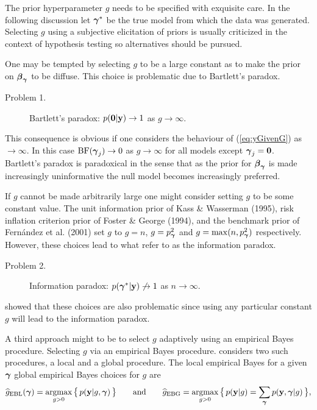 \documentclass{article}[12pt]
\begin{document}
The prior hyperparameter $g$ needs to be specified with exquisite care. 
In the following discussion let ${\boldsymbol \gamma}^*$ be the true model from which the data was generated. 
Selecting $g$ using a subjective elicitation of priors is usually criticized in the context of 
hypothesis testing so alternatives should be pursued. 

One may be tempted by selecting $g$ to be a large constant as to make the prior on
${\boldsymbol \beta}_{\boldsymbol \gamma}$ to be diffuse. This choice is problematic due to Bartlett's paradox. 
\begin{description}
	\item[Problem 1.] Bartlett's paradox: $p({\bf 0}|{\bf y}) \to 1$ as $g\to\infty$.
\end{description}

\noindent This consequence is obvious if one considers the behaviour of 
(\ref{eq:yGivenG}) as $\to\infty$. In this case $\mbox{BF}({\boldsymbol \gamma}_j)\to 0$  as $g\to\infty$ 
for all models except ${\boldsymbol \gamma}_j = {\bf 0}$.
Bartlett's paradox is paradoxical in the sense that as the prior for ${\boldsymbol \beta}_{\boldsymbol \gamma}$
is made increasingly uninformative the null model becomes increasingly preferred.

If $g$ cannot be made arbitrarily large one might consider setting $g$ to be some constant
value. The unit information prior of Kass \& Wasserman (1995), risk inflation criterion prior of 
Foster \& George (1994), and the benchmark prior of Fern\'andez et al. (2001) set $g$ to $g=n$, 
$g=p_{\boldsymbol \gamma}^2$ and $g = \max(n,p_{\boldsymbol \gamma}^2)$ respectively. 
However, these choices lead to what \cite{Liang2008} refer to as
the information paradox. 
\begin{description}
	\item[Problem 2.] Information paradox: $p({\boldsymbol \gamma}^*|{\bf y}) \not\to 1$ as $n\to\infty$.
\end{description}

\noindent  
\cite{Liang2008} showed that these choices
are also problematic since using any particular constant $g$ will lead to the information paradox.

A third approach might to be to select $g$ adaptively using an empirical Bayes procedure.
Selecting $g$ via an empirical Bayes procedure. 
\cite{Liang2008} considers two such procedures, a local and a global procedure.
The local empirical Bayes for a given ${\boldsymbol \gamma}$ global empirical Bayes choices
for $g$ are
$$
\ds \widehat{g}_{\mbox{\scriptsize EBL}}(\vgamma) = \argmax_{g>0} \big\{ \, p(\vy|g,\vgamma) \, \big\}
\qquad \mbox{and} \qquad 
\ds \widehat{g}_{\mbox{\scriptsize EBG}} = \argmax_{g>0} \big\{ \, p(\vy|g) = \sum_{\vgamma}  p(\vy,\vgamma|g)  \, \big\},
$$ 
\end{document}
